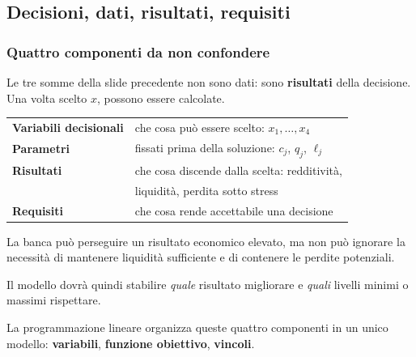 

\subsection{Decisioni, dati, risultati, requisiti}%

\begin{frame}%
%

\frametitle{Quattro componenti da non confondere}%
%

%


Le tre somme della slide precedente non sono dati: sono \textbf{risultati}
della decisione. Una volta scelto $x$, possono essere calcolate.

\medskip

\begin{center}
{\small
\begin{tabular}
[c]{ll}\hline
\textbf{Variabili decisionali} & che cosa pu\`{o} essere scelto: $x_{1}%
,\ldots,x_{4}$\\[3pt]%
\textbf{Parametri} & fissati prima della soluzione: $c_{j}$, $q_{j}$,
$\ell_{j}$\\[3pt]%
\textbf{Risultati} & che cosa discende dalla scelta: redditivit\`{a},\\
& liquidit\`{a}, perdita sotto stress\\[3pt]%
\textbf{Requisiti} & che cosa rende accettabile una decisione\\\hline
\end{tabular}
}
\end{center}

\medskip

\begin{stepitemize}
\item La banca pu\`{o} perseguire un risultato economico elevato, ma non
pu\`{o} ignorare la necessit\`{a} di mantenere liquidit\`{a} sufficiente e di
contenere le perdite potenziali.

\item Il modello dovr\`{a} quindi stabilire \emph{quale} risultato migliorare
e \emph{quali} livelli minimi o massimi rispettare.
\end{stepitemize}

\medskip

\begin{center}
{\small La programmazione lineare organizza queste quattro componenti in un
unico modello: \textbf{variabili}, \textbf{funzione obiettivo},
\textbf{vincoli}.}
\end{center}

%

\transboxout
\end{frame}%


